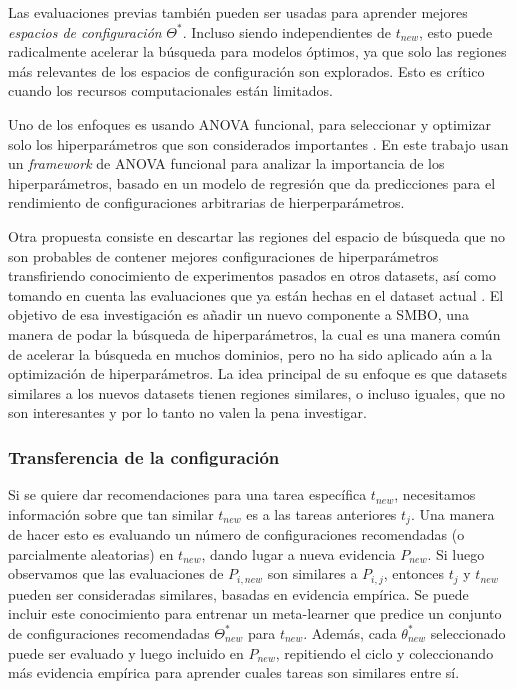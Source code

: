 Las evaluaciones previas también pueden ser usadas para aprender mejores \textit{espacios de configuración} $\Theta^*$. Incluso siendo independientes de $t_{new}$, esto puede radicalmente acelerar la búsqueda para modelos óptimos, ya que solo las regiones más relevantes de los espacios de configuración son explorados. Esto es crítico cuando los recursos computacionales están limitados. 

Uno de los enfoques es usando ANOVA funcional, para seleccionar y optimizar solo los hiperparámetros que son considerados importantes \cite{rijn2018hyp}. En este trabajo usan un \textit{framework} de ANOVA funcional para analizar la importancia de los hiperparámetros, basado en un modelo de regresión que da predicciones para el rendimiento de configuraciones arbitrarias de hierperparámetros.

Otra propuesta consiste en descartar las regiones del espacio de búsqueda que no son probables de contener mejores configuraciones de hiperparámetros transfiriendo conocimiento de experimentos pasados en otros datasets, así como tomando en cuenta las evaluaciones que ya están hechas en el dataset actual \cite{witsuba2015hyper}. El objetivo de esa investigación es añadir un nuevo componente a SMBO, una manera de podar la búsqueda de hiperparámetros, la cual es una manera común de acelerar la búsqueda en muchos dominios, pero no ha sido aplicado aún a la optimización de hiperparámetros. La idea principal de su enfoque es que datasets similares a los nuevos datasets tienen regiones similares, o incluso iguales, que no son interesantes y por lo tanto no valen la pena investigar.

\subsubsection{Transferencia de la configuración}

Si se quiere dar recomendaciones para una tarea específica $t_{new}$, necesitamos información sobre que tan similar $t_{new}$ es a las tareas anteriores $t_j$. Una manera de hacer esto es evaluando un número de configuraciones recomendadas (o parcialmente aleatorias) en $t_{new}$, dando lugar a nueva evidencia $P_{new}$. Si luego observamos que las evaluaciones de $P_{i,new}$ son similares a $P_{i,j}$, entonces $t_j$ y $t_{new}$ pueden ser consideradas similares, basadas en evidencia empírica. Se puede incluir este conocimiento para entrenar un meta-learner que predice un conjunto de configuraciones recomendadas $\Theta_{new}^*$ para $t_{new}$. Además, cada $\theta^*_{new}$ seleccionado puede ser evaluado y luego incluido en $P_{new}$, repitiendo el ciclo y coleccionando más evidencia empírica para aprender cuales tareas son similares entre sí.

